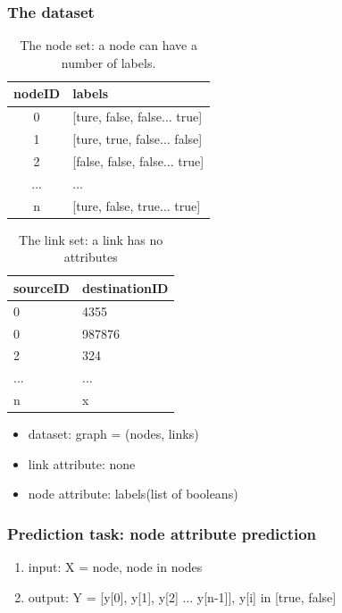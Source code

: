 \documentclass{article}
\begin{document}
\subsubsection{The dataset}
\begin{table}[H]
	\centering
	\begin{tabularx}{0.5\textwidth}{|c|X| }  \hline
		nodeID & labels \\ \hline
		0 & [ture, false, false... true] \\ \hline
		1 & [ture, true, false... false] \\ \hline
		2 & [false, false, false... true] \\ \hline
		... & ... \\ \hline
		n & [ture, false, true... true] \\ \hline
	\end{tabularx}
	\caption{The node set: a node can have a number of labels.}
\end{table}
\begin{table}[H]
	\centering
	\begin{tabularx}{0.5\textwidth}{|X|X|}  \hline
		sourceID & destinationID \\ \hline
		0 & 4355 \\ \hline
		0 & 987876 \\ \hline
		2 & 324 \\ \hline
		... & ... \\ \hline
		n & x \\ \hline
	\end{tabularx}
	\caption{The link set: a link has no attributes}
\end{table}
\begin{itemize}
	\item dataset: graph = (nodes, links)
	\item link attribute: none
	\item node attribute: labels(list of booleans)
\end{itemize}

\subsubsection{Prediction task: node attribute prediction}
\begin{enumerate}
	\item input: X = node, node in nodes
	\item output: Y = [y[0], y[1], y[2] ... y[n-1]], y[i] in [true, false]
\end{enumerate}
\end{document}
